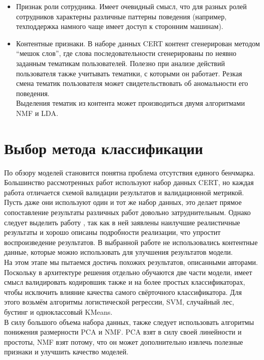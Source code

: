 \begin{itemize}
\item Признак роли сотрудника. Имеет очевидный смысл, что для разных ролей сотрудников характерны различные паттерны поведения (например, техподдержка намного чаще имеет доступ к сторонним машинам).
\item Контентные признаки. В наборе данных CERT контент сгенерирован методом ``мешок слов'', где слова последовательности сгенерированы по неявно заданным тематикам пользователей. Полезно при анализе действий пользователя также учитывать тематики, с которыми он работает. Резкая смена тематик пользователя может свидетельствовать об аномальности его поведения.\\
Выделения тематик из контента может производиться двумя алгоритмами NMF и LDA.
\end{itemize}

\section{Выбор метода классификации}

По обзору моделей становится понятна проблема отсутствия единого бенчмарка. Большинство рассмотренных работ используют набор данных CERT, но каждая работа отличается схемой валидации результатов и валидационной метрикой. Пусть даже они используют один и тот же набор данных, это делает прямое сопоставление результаты различных работ довольно затруднительным. Однако следует выделить работу \cite{yuanInsiderThreatDetection2018b}, так как в ней заявлены наилучшие реалистичные результаты и хорошо описаны подробности реализации, что упростит воспроизведение результатов. В выбранной работе не использовались контентные данные, которые можно использовать для улучшения результатов модели.\\

На этом этапе мы пытаемся достичь похожих результатов, описанными авторами.\\
Поскольку в архитектуре решения отдельно обучаются две части модели, имеет смысл валидировать кодировшик также и на более простых классификаторах, чтобы исключить влияние качества самого свёрточного классификатора. Для этого возьмём алгоритмы логистической регрессии, SVM, случайный лес, бустинг и одноклассовый KMeans.
\\
В силу большого объема набора данных, также следует использовать алгоритмы понижения размерности PCA и NMF. PCA взят в силу своей линейности и простоты, NMF взят потому, что он может дополнительно извлечь полезные признаки и улучшить качество моделей.\\

